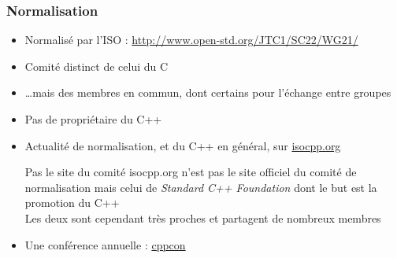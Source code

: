 \documentclass[C++.tex]{subfiles}
\begin{document}
\begin{frame}
	\frametitle{Normalisation}
	\begin{itemize}
		\item Normalisé par l'ISO : \url{http://www.open-std.org/JTC1/SC22/WG21/}


		\item Comité distinct de celui du C


		\item \ldots mais des membres en commun, dont certains pour l'échange entre groupes
		\item Pas de propriétaire du C++


		\item Actualité de normalisation, et du C++ en général, sur \href{https://isocpp.org/}{isocpp.org}


	\begin{alertblock}{Pas le site du comité}
		isocpp.org n'est pas le site officiel du comité de normalisation mais celui de \textit{Standard C++ Foundation} dont le but est la promotion du C++\\
		Les deux sont cependant très proches et partagent de nombreux membres
		
	\end{alertblock}

		\item Une conférence annuelle : \href{http://cppcon.org/}{cppcon}

	\end{itemize}
\end{frame}
\end{document}
